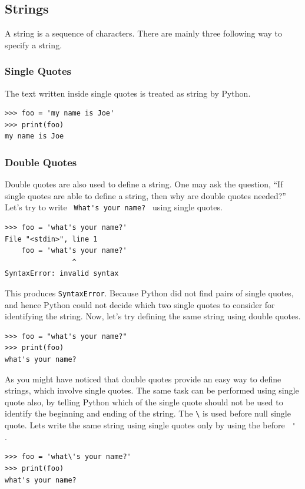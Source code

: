 \documentclass[10pt]{book}
\begin{document}
{\subsection{Strings}
A string is a sequence of characters. There are mainly three following way to specify a string.

\subsubsection{Single Quotes}
The text written inside single quotes is treated as string by Python. 
\beforeverb
\begin{verbatim}
>>> foo = 'my name is Joe'
>>> print(foo)
my name is Joe
\end{verbatim}
\afterverb

\subsubsection{Double Quotes}
Double quotes are also used to define a string. One may ask the question, ``If single quotes 
are able to define a string, then why are double quotes needed?'' Let's try to write 
\verb" What's your name? " using single quotes.
\beforeverb
\begin{verbatim}
>>> foo = 'what's your name?'
File "<stdin>", line 1
    foo = 'what's your name?'
                ^
SyntaxError: invalid syntax
\end{verbatim}
\afterverb
This produces \verb"SyntaxError". Because Python did not find pairs of single quotes, and hence 
Python could not decide which two single quotes to consider for identifying the string. Now,
let's try defining the same string using double quotes. 

\beforeverb
\begin{verbatim}
>>> foo = "what's your name?"
>>> print(foo)
what's your name?
\end{verbatim}
\afterverb
As you might have noticed that double quotes provide an easy way to define strings,
which involve single quotes. The same task can be performed using single quote also, by
telling Python which of the single quote should not be used to identify the beginning
and ending of the string. The \verb"\" is used before null single quote. Lets write the same 
string using single quotes only by using the  before \verb" ' ". 
\beforeverb \begin{verbatim}
>>> foo = 'what\'s your name?'
>>> print(foo)
what's your name?
\end{verbatim} \afterverb

}
\end{document}
